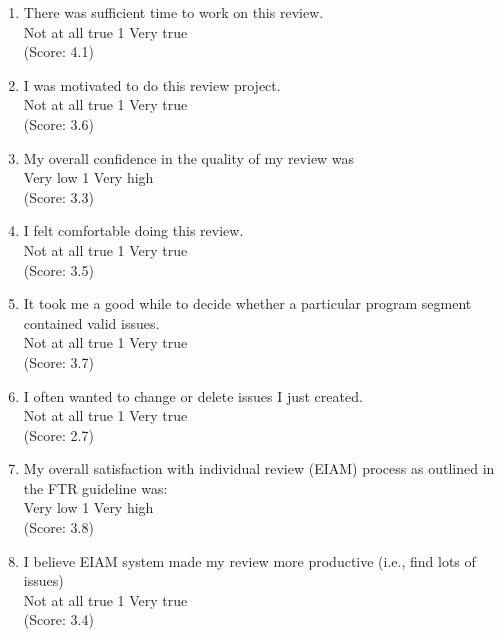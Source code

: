 \begin{enumerate}
\item   There was sufficient time to work on this review.
\\
Not at all true \hfill 1     \hfill Very true\\
(Score: 4.1)

\item   I was motivated to do this review project.
\\
Not at all true \hfill 1     \hfill Very true\\
(Score: 3.6)

\item  My overall confidence in the quality of my review was
\\
Very low \hfill 1     \hfill Very high\\
(Score: 3.3)

\item  I felt comfortable doing this review.
\\
Not at all true \hfill 1     \hfill Very true\\
(Score: 3.5)

\item  It took me a good while to decide whether a particular program
segment contained valid issues.
\\
Not at all true \hfill 1     \hfill Very true\\
(Score: 3.7)

\item  I often wanted to change or delete issues I just created.
\\
Not at all true \hfill 1     \hfill Very true\\
(Score: 2.7)

\item  My overall satisfaction with individual review (EIAM) process as
outlined in the FTR guideline was:
\\
Very low \hfill 1     \hfill Very high\\
(Score: 3.8)

\item  I believe EIAM system made my review more productive (i.e., find
lots of issues) 
\\
Not at all true \hfill 1     \hfill Very true\\
(Score: 3.4)


\end{enumerate}
